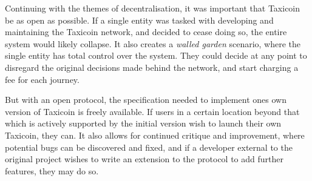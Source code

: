Continuing with the themes of decentralisation, it was important that Taxicoin be as open as possible. If a single entity was tasked with developing and maintaining the Taxicoin network, and decided to cease doing so, the entire system would likely collapse. It also creates a \textit{walled garden} scenario, where the single entity has total control over the system. They could decide at any point to disregard the original decisions made behind the network, and start charging a fee for each journey.


But with an open protocol, the specification needed to implement ones own version of Taxicoin is freely available. If users in a certain location beyond that which is actively supported by the initial version wish to launch their own Taxicoin, they can. It also allows for continued critique and improvement, where potential bugs can be discovered and fixed, and if a developer external to the original project wishes to write an extension to the protocol to add further features, they may do so.
